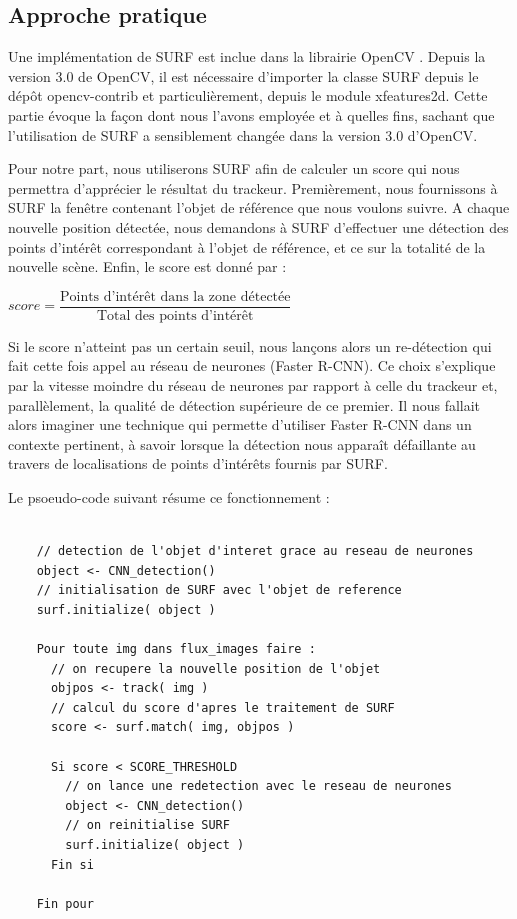 	\subsection{Approche pratique}
	
	Une implémentation de SURF est inclue dans la librairie OpenCV \cite{Bib_SURFOpenCV}. Depuis la version 3.0 de OpenCV, il est nécessaire d'importer la classe SURF depuis le dépôt opencv-contrib et particulièrement, depuis
	le module xfeatures2d. Cette partie évoque la façon dont nous l'avons employée et à quelles fins, sachant que l'utilisation de SURF a sensiblement changée dans la version 3.0 d'OpenCV.   
	
	Pour notre part, nous utiliserons SURF afin de calculer un score qui nous permettra d'apprécier le résultat du trackeur. Premièrement, nous fournissons à SURF la fenêtre contenant l'objet de référence que nous voulons suivre.
	A chaque nouvelle position détectée, nous demandons à SURF d'effectuer une détection des points d'intérêt correspondant à l'objet de référence, et ce sur la totalité de la nouvelle scène. Enfin, le score est donné par : 
	\begin{center} 
	  $ score = \dfrac{\text{Points d'intérêt dans la zone détectée}}{\text{Total des points d'intérêt}}$
	\end{center}
	
	Si le score n'atteint pas un certain seuil, nous lançons alors un re-détection qui fait cette fois appel au réseau de neurones (Faster R-CNN). Ce choix s'explique par la vitesse moindre du 
	réseau de neurones par rapport à celle du trackeur et, parallèlement, la qualité de détection supérieure de ce premier. Il nous fallait alors imaginer une technique qui permette d'utiliser Faster R-CNN dans un contexte pertinent, 
	à savoir lorsque la détection nous apparaît défaillante au travers de localisations de points d'intérêts fournis par SURF. 
	
	Le psoeudo-code suivant résume ce fonctionnement :
	
	\begin{lstlisting}
	
	// detection de l'objet d'interet grace au reseau de neurones
	object <- CNN_detection()
	// initialisation de SURF avec l'objet de reference
	surf.initialize( object )  
	
	Pour toute img dans flux_images faire : 
	  // on recupere la nouvelle position de l'objet 
	  objpos <- track( img )
	  // calcul du score d'apres le traitement de SURF
	  score <- surf.match( img, objpos )
	  
	  Si score < SCORE_THRESHOLD
	    // on lance une redetection avec le reseau de neurones
	    object <- CNN_detection()
	    // on reinitialise SURF
	    surf.initialize( object )
	  Fin si
	
	Fin pour
	
	\end{lstlisting}
	
	